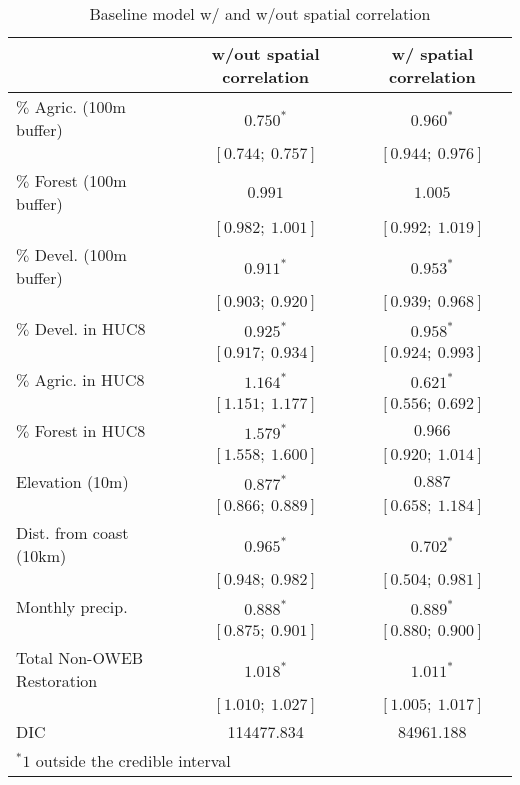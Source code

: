 
\begin{table}
\caption{Baseline model w/ and w/out spatial correlation}
\begin{center}
\begin{tabular}{l c c }
\hline
                           & w/out spatial correlation & w/ spatial correlation \\
\hline
$\%$  Agric. (100m buffer) & $0.750^{*}$       & $0.960^{*}$       \\
                           & $[0.744;\ 0.757]$ & $[0.944;\ 0.976]$ \\
$\%$  Forest (100m buffer) & $0.991$           & $1.005$           \\
                           & $[0.982;\ 1.001]$ & $[0.992;\ 1.019]$ \\
$\%$  Devel. (100m buffer) & $0.911^{*}$       & $0.953^{*}$       \\
                           & $[0.903;\ 0.920]$ & $[0.939;\ 0.968]$ \\
$\%$  Devel. in HUC8       & $0.925^{*}$       & $0.958^{*}$       \\
                           & $[0.917;\ 0.934]$ & $[0.924;\ 0.993]$ \\
$\%$  Agric. in HUC8       & $1.164^{*}$       & $0.621^{*}$       \\
                           & $[1.151;\ 1.177]$ & $[0.556;\ 0.692]$ \\
$\%$  Forest in HUC8       & $1.579^{*}$       & $0.966$           \\
                           & $[1.558;\ 1.600]$ & $[0.920;\ 1.014]$ \\
Elevation (10m)            & $0.877^{*}$       & $0.887$           \\
                           & $[0.866;\ 0.889]$ & $[0.658;\ 1.184]$ \\
Dist. from coast (10km)    & $0.965^{*}$       & $0.702^{*}$       \\
                           & $[0.948;\ 0.982]$ & $[0.504;\ 0.981]$ \\
Monthly precip.            & $0.888^{*}$       & $0.889^{*}$       \\
                           & $[0.875;\ 0.901]$ & $[0.880;\ 0.900]$ \\
Total Non-OWEB Restoration & $1.018^{*}$       & $1.011^{*}$       \\
                           & $[1.010;\ 1.027]$ & $[1.005;\ 1.017]$ \\
\hline
DIC                        & 114477.834        & 84961.188         \\
\hline
\multicolumn{3}{l}{\scriptsize{$^* 1$ outside the credible interval}}
\end{tabular}
\label{table:basemods}
\end{center}
\end{table}
